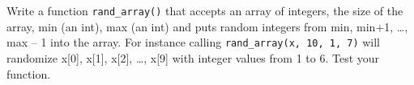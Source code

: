  Write a function \texttt{rand\_array()} that accepts an array of integers, the size of the array, min (an int), max (an int) and puts random integers from min, min+1, \ldots, max -- 1 into the array. For instance calling \texttt{rand\_array(x, 10, 1, 7)} will randomize x[0], x[1], x[2], \ldots, x[9] with integer values from 1 to 6. Test your function.

